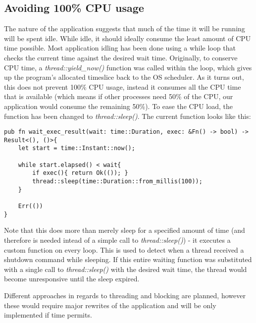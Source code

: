 \documentclass[12pt,a4paper,table]{article}
\begin{document}
        \subsection{Avoiding 100\% CPU usage}
            The nature of the application suggests that much of the time it will be running will be spent idle. While idle, it should ideally consume the least amount of CPU time possible. Most application idling has been done using a while loop that checks the current time against the desired wait time. Originally, to conserve CPU time, a \textit{thread::yield\_now()} function was called within the loop, which gives up the program's allocated timeslice back to the OS scheduler. As it turns out, this does not prevent 100\% CPU usage, instead it consumes all the CPU time that is available (which means if other processes need 50\% of the CPU, our application would consume the remaining 50\%). To ease the CPU load, the function has been changed to \textit{thread::sleep()}. The current function looks like this:
\begin{verbatim}
pub fn wait_exec_result(wait: time::Duration, exec: &Fn() -> bool) -> Result<(), ()>{
    let start = time::Instant::now();

    while start.elapsed() < wait{
        if exec(){ return Ok(()); }
        thread::sleep(time::Duration::from_millis(100));
    }
    
    Err(())
}
\end{verbatim}
        Note that this does more than merely sleep for a specified amount of time (and therefore is needed intead of a simple call to \textit{thread::sleep()}) - it executes a custom function on every loop. This is used to detect when a thread received a shutdown command while sleeping. If this entire waiting function was substituted with a single call to \textit{thread::sleep()} with the desired wait time, the thread would become unresponsive until the sleep expired.

        Different approaches in regards to threading and blocking are planned, however these would require major rewrites of the application and will be only implemented if time permits.
\end{document}
